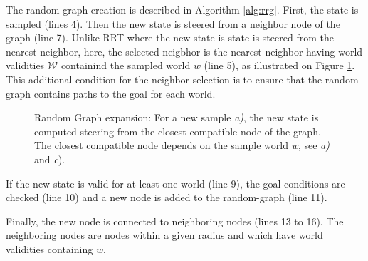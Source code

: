 \documentclass[letterpaper, 10 pt, conference]{ieeeconf}  %
\begin{document}


The random-graph creation is described in Algorithm \ref{alg:rrg}. First, the state is sampled (lines 4). Then the new state is steered from a neighbor node of the graph (line 7). Unlike RRT where the new state is state is steered from the nearest neighbor, here, the selected neigbhor is the nearest neighbor having world validities $\mathcal{W}$ containind the sampled world $w$ (line 5), as illustrated on Figure \ref{fig:expansion}. This additional condition for the neighbor selection is to ensure that the random graph contains paths to the goal for each world.
 


\begin{figure}[!htb]
 \caption{Random Graph expansion: For a new sample \textit{a)}, the new state is computed steering from the closest compatible node of the graph. The closest compatible node depends on the sample world \textit{w}, see \textit{a)} and \textit{c}).}
 \label{fig:expansion}
\end{figure}
If the new state is valid for at least one world (line 9), the goal conditions are checked (line 10) and a new node is added to the random-graph (line 11).

Finally, the new node is connected to neighboring nodes (lines 13 to 16). The neighboring nodes are nodes within a given radius and which have world validities containing $w$.
\end{document}
